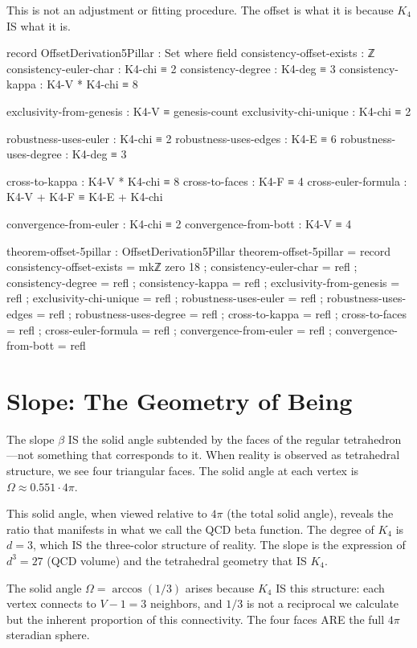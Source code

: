 \documentclass[11pt,a4paper]{book}
\begin{document}
This is not an adjustment or fitting procedure. The offset is what it is because $K_4$ IS what it is.

\begin{code}
record OffsetDerivation5Pillar : Set where
  field
    consistency-offset-exists : ℤ
    consistency-euler-char : K4-chi ≡ 2
    consistency-degree : K4-deg ≡ 3
    consistency-kappa : K4-V * K4-chi ≡ 8
    
    exclusivity-from-genesis : K4-V ≡ genesis-count
    exclusivity-chi-unique : K4-chi ≡ 2
    
    robustness-uses-euler : K4-chi ≡ 2
    robustness-uses-edges : K4-E ≡ 6
    robustness-uses-degree : K4-deg ≡ 3
    
    cross-to-kappa : K4-V * K4-chi ≡ 8
    cross-to-faces : K4-F ≡ 4
    cross-euler-formula : K4-V + K4-F ≡ K4-E + K4-chi
    
    convergence-from-euler : K4-chi ≡ 2
    convergence-from-bott : K4-V ≡ 4

theorem-offset-5pillar : OffsetDerivation5Pillar
theorem-offset-5pillar = record
  { consistency-offset-exists = mkℤ zero 18
  ; consistency-euler-char = refl
  ; consistency-degree = refl
  ; consistency-kappa = refl
  ; exclusivity-from-genesis = refl
  ; exclusivity-chi-unique = refl
  ; robustness-uses-euler = refl
  ; robustness-uses-edges = refl
  ; robustness-uses-degree = refl
  ; cross-to-kappa = refl
  ; cross-to-faces = refl
  ; cross-euler-formula = refl
  ; convergence-from-euler = refl
  ; convergence-from-bott = refl
  }
\end{code}

\section{Slope: The Geometry of Being}

The slope $\beta$ IS the solid angle subtended by the faces of the regular tetrahedron—not something that corresponds to it.
When reality is observed as tetrahedral structure, we see four triangular faces. The solid angle at each vertex is $\Omega \approx 0.551 \cdot 4\pi$.

This solid angle, when viewed relative to $4\pi$ (the total solid angle), reveals the ratio that manifests in what we call the QCD beta function.
The degree of $K_4$ is $d = 3$, which IS the three-color structure of reality. The slope is the expression of $d^3 = 27$ (QCD volume) and the tetrahedral geometry that IS $K_4$.

The solid angle $\Omega = \arccos(1/3)$ arises because $K_4$ IS this structure: each vertex connects to $V - 1 = 3$ neighbors, and $1/3$ is not a reciprocal we calculate but the inherent proportion of this connectivity. The four faces ARE the full $4\pi$ steradian sphere.
\end{document}

